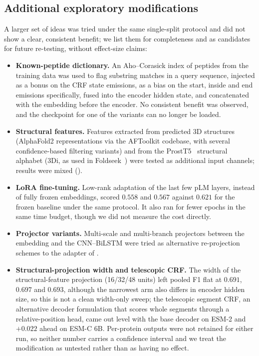 \documentclass{article}
\begin{document}
\subsection{Additional exploratory modifications}

A larger set of ideas was tried under the same single-split protocol and did not show a clear, consistent benefit; we list them for completeness and as candidates for future re-testing, without effect-size claims:

\begin{itemize}
  \item \textbf{Known-peptide dictionary.} An Aho--Corasick index of peptides from the training data was used to flag substring matches in a query sequence, injected as a bonus on the CRF state emissions, as a bias on the start, inside and end emissions specifically, fused into the encoder hidden state, and concatenated with the embedding before the encoder. No consistent benefit was observed, and the checkpoint for one of the variants can no longer be loaded.
  \item \textbf{Structural features.} Features extracted from predicted 3D structures (AlphaFold2 representations via the AFToolkit codebase, with several confidence-based filtering variants) and from the ProstT5~\citep{heinzinger2023prostt5} structural alphabet (3Di, as used in Foldseek~\citep{vankempen2024foldseek}) were tested as additional input channels; results were mixed ().
  \item \textbf{LoRA fine-tuning.} Low-rank adaptation of the last few pLM layers, instead of fully frozen embeddings, scored $0.558$ and $0.567$ against $0.621$ for the frozen baseline under the same protocol. It also ran for fewer epochs in the same time budget, though we did not measure the cost directly.
  \item \textbf{Projector variants.} Multi-scale and multi-branch projectors between the embedding and the CNN--BiLSTM were tried as alternative re-projection schemes to the adapter of .
  \item \textbf{Structural-projection width and telescopic CRF.} The width of the structural-feature projection (16/32/48 units) left pooled F1 flat at $0.691$, $0.697$ and $0.693$, although the narrowest arm also differs in encoder hidden size, so this is not a clean width-only sweep; the telescopic segment CRF, an alternative decoder formulation that scores whole segments through a relative-position head, came out level with the base decoder on ESM-2 and $+0.022$ ahead on ESM-C 6B. Per-protein outputs were not retained for either run, so neither number carries a confidence interval and we treat the modification as untested rather than as having no effect.
\end{itemize}
\end{document}

